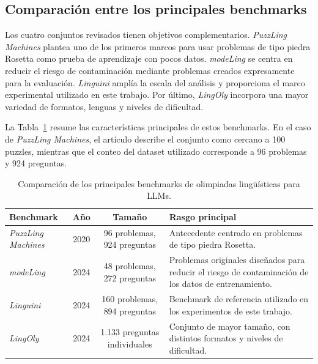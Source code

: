 \subsection{Comparación entre los principales benchmarks}

Los cuatro conjuntos revisados tienen objetivos complementarios. \textit{PuzzLing Machines} plantea uno de los primeros marcos para usar problemas de tipo piedra Rosetta como prueba de aprendizaje con pocos datos. \textit{modeLing} se centra en reducir el riesgo de contaminación mediante problemas creados expresamente para la evaluación. \textit{Linguini} amplía la escala del análisis y proporciona el marco experimental utilizado en este trabajo. Por último, \textit{LingOly} incorpora una mayor variedad de formatos, lenguas y niveles de dificultad.

La Tabla~\ref{tab:comparacion_benchmarks} resume las características principales de estos benchmarks. En el caso de \textit{PuzzLing Machines}, el artículo describe el conjunto como cercano a 100 puzzles, mientras que el conteo del dataset utilizado corresponde a 96 problemas y 924 preguntas.

\begin{table}[ht]
	\centering
	\caption{Comparación de los principales benchmarks de olimpiadas lingüísticas para LLMs.}
	\label{tab:comparacion_benchmarks}
	\begin{tabularx}{\textwidth}{l c c X}
		\toprule
		\textbf{Benchmark} & \textbf{Año} & \textbf{Tamaño} & \textbf{Rasgo principal} \\
		\midrule
		\textit{PuzzLing Machines} 
		& 2020 
		& 96 problemas, 924 preguntas
		& Antecedente centrado en problemas de tipo piedra Rosetta. \\
		
		\textit{modeLing} 
		& 2024 
		& 48 problemas, 272 preguntas 
		& Problemas originales diseñados para reducir el riesgo de contaminación de los datos de entrenamiento. \\
		
		\textit{Linguini} 
		& 2024 
		& 160 problemas, 894 preguntas 
		& Benchmark de referencia utilizado en los experimentos de este trabajo. \\
		
		\textit{LingOly} 
		& 2024 
		& 1.133 preguntas individuales
		& Conjunto de mayor tamaño, con distintos formatos y niveles de dificultad. \\
		\bottomrule
	\end{tabularx}
\end{table}

